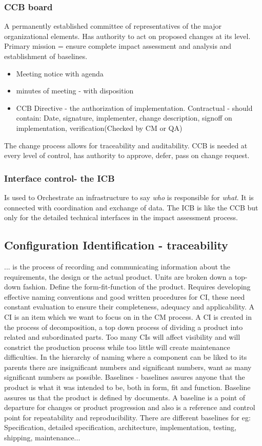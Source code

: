 \subsubsection{CCB board} A permanently established committee of representatives of the major organizational elements. Has authority to act on proposed changes at its level.
Primary mission = ensure complete impact assessment and analysis and establishment of baselines.
\begin{itemize}
    \item Meeting notice with agenda
    \item minutes of meeting - with disposition
    \item CCB Directive - the authorization of implementation. Contractual - should contain: Date, signature, implementer, change description, signoff on implementation, verification(Checked by CM or QA)
\end{itemize}
The change process allows for traceability and auditability. CCB is needed at every level of control, has authority to approve, defer, pass on change request.
\subsubsection{Interface control- the ICB}
Is used to Orchestrate an infrastructure to say \textit{who} is responsible for \textit{what}. It is connected with coordination and exchange of data.
The ICB is like the CCB but only for the detailed technical interfaces in the impact assessment process.

\subsection{Configuration Identification - traceability}
... is the process of recording and communicating information about the requirements, the design or the actual product. Units are broken down a top-down fashion.
Define the form-fit-function of the product. Requires developing effective naming conventions and good written procedures for CI, these need constant evaluation to ensure their completeness,
adequacy and applicability. A CI is an item which we want to focus on in the CM process. A CI is created in the process of decomposition, a top down process of dividing a product into related and subordinated parts.
Too many CIs will affect visibility and will constrict the production process while too little will create maintenance difficulties. In the hierarchy of naming where a component can be liked 
to its parents there are insignificant numbers and significant numbers, want as many significant numbers as possible.
Baselines - baselines assures anyone that the product is what it was intended to be, both in form, fit and function. Baseline assures us that the product is defined by documents.
A baseline is a point of departure for changes or product progression and also is a reference and control point for repeatability and reproducibility. There are different baselines for eg:
Specification, detailed specification, architecture, implementation, testing, shipping, maintenance...


